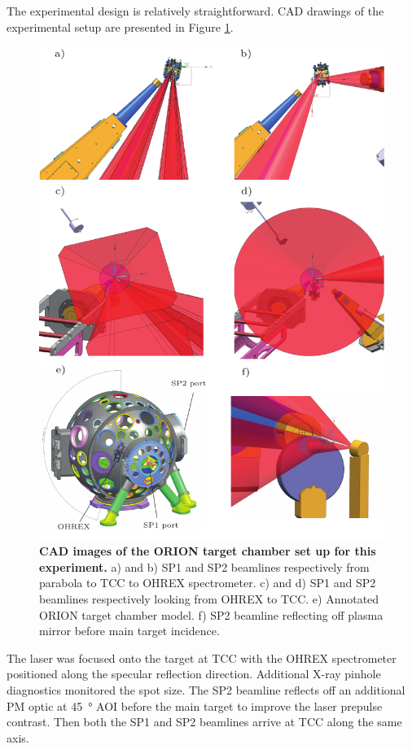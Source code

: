 The experimental design is relatively straightforward. CAD drawings of the experimental setup are presented in Figure \ref{fig:orioncad}.
\begin{figure}
	\centering
	\includegraphics[width=1\linewidth]{figures/orion/orion_cad}
	\caption[ORION HHG experiment target chamber set up.]{\textbf{CAD images of the ORION target chamber set up for this experiment.} a) and b) SP1 and SP2 beamlines respectively from parabola to TCC to OHREX spectrometer. c) and d) SP1 and SP2 beamlines respectively looking from OHREX to TCC. e) Annotated ORION target chamber model. f) SP2 beamline reflecting off plasma mirror before main target incidence.}
	\label{fig:orioncad}
\end{figure}
The laser was focused onto the target at \ac{TCC} with the \ac{OHREX} spectrometer positioned along the specular reflection direction. Additional X-ray pinhole diagnostics monitored the spot size. The SP2 beamline reflects off an additional \ac{PM} optic at \qty{45}{\degree} \ac{AOI} before the main target to improve the laser prepulse contrast. Then both the SP1 and SP2 beamlines arrive at \ac{TCC} along the same axis.

